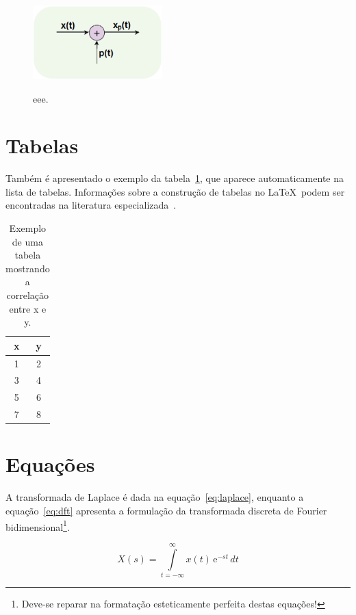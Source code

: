\documentclass[openright]{normas-utf-tex} %
\begin{document}
\begin{figure}[!htb]
	\centering
	\caption[Exemplo de uma figura]{eee.}
	\includegraphics[width=5cm]{./dummy.eps} %
	\label{fig:dummy}
\end{figure}


\section{Tabelas}
\label{sec:tabelas}

Também é apresentado o exemplo da tabela~\ref{tab:correlacao}, que aparece automaticamente na lista de tabelas. Informações sobre a construção de tabelas no \LaTeX\ podem ser encontradas na literatura especializada~\cite{Lamport1986,Buerger1989,Kopka2003,Mittelbach2004}.

\begin{table}[!htb]
	\centering
	\caption[Exemplo de uma tabela]{Exemplo de uma tabela mostrando a correlação entre x e y.}
	\label{tab:correlacao}
	\begin{tabular}{cc}
		\hline
		x & y \\
		\hline
		1 & 2 \\
		3 & 4 \\
		5 & 6 \\
		7 & 8 \\
		\hline
	\end{tabular}
\end{table}



\section{Equações}
\label{sec:equacoes}

A transformada de Laplace é dada na equação~\eqref{eq:laplace}, enquanto a equação~\eqref{eq:dft} apresenta a formulação da transformada discreta de Fourier bidimensional\footnote{Deve-se reparar na formatação esteticamente perfeita destas equações!}.

\begin{equation}
X(s) = \int\limits_{t = -\infty}^{\infty} x(t) \, \text{e}^{-st} \, dt
\label{eq:laplace}
\end{equation}
\end{document}
